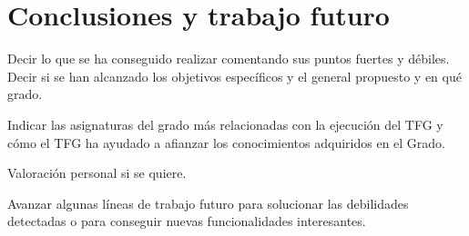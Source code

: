 \documentclass[a4paper,11pt]{book}
\begin{document}








\chapter{Conclusiones y trabajo futuro}

Decir lo que se ha conseguido realizar comentando sus puntos fuertes y débiles.
Decir si se han alcanzado los objetivos específicos y el general propuesto y en qué grado.

Indicar las asignaturas del grado más relacionadas con la ejecución del TFG y cómo el TFG ha ayudado a afianzar los conocimientos adquiridos en el Grado.

Valoración personal si se quiere.


Avanzar algunas líneas de trabajo futuro para solucionar las debilidades detectadas o para conseguir nuevas funcionalidades interesantes.
\end{document}
